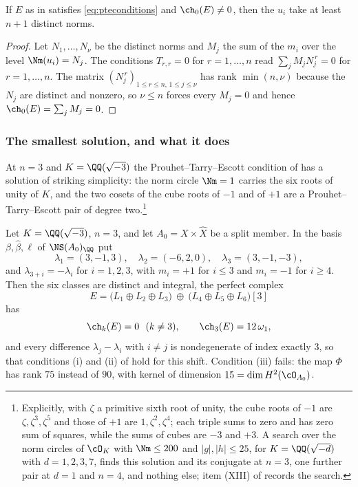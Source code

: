 \begin{corollary}\label{cor:nplusone}
If $E$ as in  satisfies \eqref{eq:pteconditions} and
$\ch_{0}(E)\ne0$, then the $u_{i}$ take at least $n+1$ distinct norms.
\end{corollary}

\begin{proof}
Let $N_{1},\dots,N_{\nu}$ be the distinct norms and $M_{j}$ the sum of the
$m_{i}$ over the level $\Nm(u_{i})=N_{j}$. The conditions $T_{r,r}=0$ for
$r=1,\dots,n$ read $\sum_{j}M_{j}N_{j}^{\,r}=0$ for $r=1,\dots,n$. The matrix
$(N_{j}^{\,r})_{1\le r\le n,\,1\le j\le\nu}$ has rank $\min(n,\nu)$ because the
$N_{j}$ are distinct and nonzero, so $\nu\le n$ forces every $M_{j}=0$ and
hence $\ch_{0}(E)=\sum_{j}M_{j}=0$.
\end{proof}

\subsubsection*{The smallest solution, and what it does}

At $n=3$ and $K=\QQ(\sqrt{-3})$ the Prouhet--Tarry--Escott condition of
 has a solution of striking simplicity: the norm circle
$\Nm=1$ carries the six roots of unity of $K$, and the two cosets of the cube
roots of $-1$ and of $+1$ are a Prouhet--Tarry--Escott pair of degree
two.\footnote{Explicitly, with $\zeta$ a primitive sixth root of unity, the
cube roots of $-1$ are $\zeta,\zeta^{3},\zeta^{5}$ and those of $+1$ are
$1,\zeta^{2},\zeta^{4}$; each triple sums to zero and has zero sum of squares,
while the sums of cubes are $-3$ and $+3$. A search over the norm circles of
$\cO_{K}$ with $\Nm\le200$ and $|g|,|h|\le25$, for $K=\QQ(\sqrt{-d})$ with
$d=1,2,3,7$, finds this solution and its conjugate at $n=3$, one further pair
at $d=1$ and $n=4$, and nothing else; item (XIII) of 
records the search.}

\begin{proposition}[The object at $n=3$, written out]\label{prop:explicitobject}
Let $K=\QQ(\sqrt{-3})$, $n=3$, and let $A_{0}=X\times\widehat X$ be a split
member. In the basis $\beta,\widehat\beta,\ell$ of $\NS(A_{0})_{\QQ}$ put
\[
  \lambda_{1}=(3,-1,3),\quad
  \lambda_{2}=(-6,2,0),\quad
  \lambda_{3}=(3,-1,-3),
\]
and $\lambda_{3+i}=-\lambda_{i}$ for $i=1,2,3$, with $m_{i}=+1$ for
$i\le3$ and $m_{i}=-1$ for $i\ge4$. Then the six classes are distinct and
integral, the perfect complex
\[
  E=\bigl(L_{1}\oplus L_{2}\oplus L_{3}\bigr)\ \oplus\
    \bigl(L_{4}\oplus L_{5}\oplus L_{6}\bigr)[3]
\]
has
\[
  \ch_{k}(E)=0\ \ (k\ne3),
  \qquad
  \ch_{3}(E)=12\,\omega_{1},
\]
and every difference $\lambda_{j}-\lambda_{i}$ with $i\ne j$ is nondegenerate
of index exactly $3$, so that conditions (i) and (ii) of
 hold for this shift. Condition (iii) fails: the map
$\Phi$ has rank $75$ instead of $90$, with kernel of dimension
$15=\dim H^{2}(\cO_{A_{0}})$.
\end{proposition}

